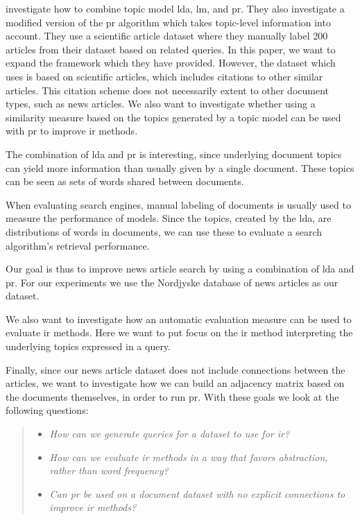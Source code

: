 \citeauthor{yang2009topic}\cite{yang2009topic} investigate how to combine topic model \gls{lda}, \gls{lm}, and \gls{pr}.
They also investigate a modified version of the \gls{pr} algorithm which takes topic-level information into account.
They use a scientific article dataset where they manually label 200 articles from their dataset based on related queries. 
In this paper, we want to expand the framework which they have provided.
However, the dataset which \cite{yang2009topic} uses is based on scientific articles, which includes citations to other similar articles.
This citation scheme does not necessarily extent to other document types, such as news articles.
We also want to investigate whether using a similarity measure based on the topics generated by a topic model can be used with \gls{pr} to improve \gls{ir} methods.

The combination of \gls{lda} and \gls{pr} is interesting, since underlying document topics can yield more information than usually given by a single document.
These topics can be seen as sets of words shared between documents. 

When evaluating search engines, manual labeling of documents is usually used to measure the performance of models\cite{yang2009topic}\cite{Tang2008}.
Since the topics, created by the \gls{lda}, are distributions of words in documents, we can use these to evaluate a search algorithm's retrieval performance. 

Our goal is thus to improve news article search by using a combination of \gls{lda} and \gls{pr}.
For our experiments we use the Nordjyske database of news articles as our dataset.

We also want to investigate how an automatic evaluation measure can be used to evaluate \gls{ir} methods.
Here we want to put focus on the \gls{ir} method interpreting the underlying topics expressed in a query.

Finally, since our news article dataset does not include connections between the articles, we want to investigate how we can build an adjacency matrix based on the documents themselves, in order to run \gls{pr}.
With these goals we look at the following questions:
\begin{quote}
	\begin{itemize}
		\item \emph{How can we generate queries for a dataset to use for \gls{ir}?}
		\item \emph{How can we evaluate \gls{ir} methods in a way that favors abstraction, rather than word frequency?}
	        \item \emph{Can \gls{pr} be used on a document dataset with no explicit connections to improve \gls{ir} methods?}
	\end{itemize}
\end{quote}




